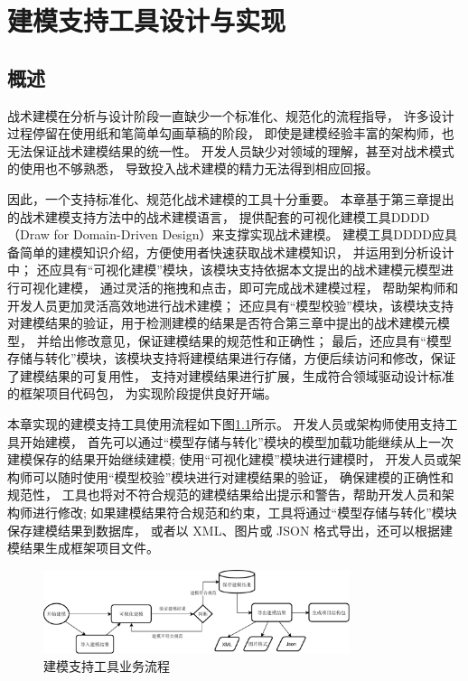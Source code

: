 \chapter{建模支持工具设计与实现}

\section{概述}

战术建模在分析与设计阶段一直缺少一个标准化、规范化的流程指导，
许多设计过程停留在使用纸和笔简单勾画草稿的阶段，
即使是建模经验丰富的架构师，也无法保证战术建模结果的统一性。
开发人员缺少对领域的理解，甚至对战术模式的使用也不够熟悉，
导致投入战术建模的精力无法得到相应回报。

因此，一个支持标准化、规范化战术建模的工具十分重要。
本章基于第三章提出的战术建模支持方法中的战术建模语言，
提供配套的可视化建模工具DDDD（Draw for Domain-Driven Design）来支撑实现战术建模。
建模工具DDDD应具备简单的建模知识介绍，方便使用者快速获取战术建模知识，
并运用到分析设计中；
还应具有“可视化建模”模块，该模块支持依据本文提出的战术建模元模型进行可视化建模，
通过灵活的拖拽和点击，即可完成战术建模过程，
帮助架构师和开发人员更加灵活高效地进行战术建模；
还应具有“模型校验”模块，该模块支持对建模结果的验证，用于检测建模的结果是否符合第三章中提出的战术建模元模型，
并给出修改意见，保证建模结果的规范性和正确性；
最后，还应具有“模型存储与转化”模块，该模块支持将建模结果进行存储，方便后续访问和修改，保证了建模结果的可复用性，
支持对建模结果进行扩展，生成符合领域驱动设计标准的框架项目代码包，
为实现阶段提供良好开端。

本章实现的建模支持工具使用流程如下图\ref{toolprocess}所示。
开发人员或架构师使用支持工具开始建模，
首先可以通过“模型存储与转化”模块的模型加载功能继续从上一次建模保存的结果开始继续建模;
使用“可视化建模”模块进行建模时，
开发人员或架构师可以随时使用“模型校验”模块进行对建模结果的验证，
确保建模的正确性和规范性，
工具也将对不符合规范的建模结果给出提示和警告，帮助开发人员和架构师进行修改;
如果建模结果符合规范和约束，工具将通过“模型存储与转化”模块保存建模结果到数据库， 
或者以 XML、图片或 JSON 格式导出，还可以根据建模结果生成框架项目文件。


\begin{figure}[!htbp] %
    \centering %
    \includegraphics[width=0.8\textwidth]{FIGs/chapter4/toolprocess.pdf} %
    \caption{建模支持工具业务流程} %
    \label{toolprocess} %
\end{figure}%




